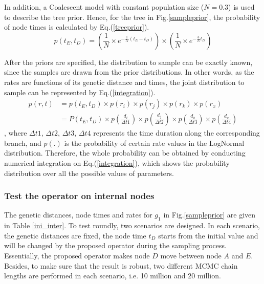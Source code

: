 \documentclass{bmcart}
\begin{document}
In addition, a Coalescent model with constant population size ($N=0.3$) is used to describe the tree prior. Hence, for the tree in Fig.\ref{sampleprior}, the probability of node times is calculated by Eq.(\ref{treeprior}).
\begin{equation}\label{treeprior}
p({t_E},{t_D}) = (\frac{1}{N} \times {e^{ - \frac{1}{N}({t_E} - {t_D})}}) \times (\frac{1}{N} \times {e^{ - \frac{3}{N}{t_D}}})
\end{equation}

After the priors are specified, the distribution to sample can be exactly known, since the samples are drawn from the prior distributions. In other words, as the rates are functions of its genetic distance and times, the joint distribution to sample can be represented by Eq.(\ref{integration}).
\begin{equation}\label{integration}
\begin{aligned}
p(r,t) &= p({t_E},{t_D}) \times p({r_i}) \times p({r_j}) \times p({r_k}) \times p({r_x}) \\&= P({t_E},{t_D}) \times p(\frac{{{d_i}}}{{\Delta t1}}) \times p(\frac{{{d_j}}}{{\Delta t2}}) \times p(\frac{{{d_k}}}{{\Delta t3}}) \times p(\frac{{{d_x}}}{{\Delta t4}})
\end{aligned}
\end{equation}
, where ${\Delta t1}$, ${\Delta t2}$, ${\Delta t3}$, ${\Delta t4}$ represents the time duration along the corresponding branch, and $p({.})$ is the probability of certain rate values in the LogNormal distribution. Therefore, the whole probability can be obtained by conducting numerical integration on Eq.(\ref{integration}), which shows the probability distribution over all the possible values of parameters.
\subsubsection*{Test the operator on internal nodes}
The genetic distances, node times and rates for $g_1$ in Fig.\ref{sampleprior} are given in Table \ref{ini_inter}. To test roundly, two scenarios are designed. In each scenario, the genetic distances are fixed, the node time $t_D$ starts from the initial value and will be changed by the proposed operator during the sampling process. Essentially, the proposed operator makes node $D$ move between node $A$ and $E$. Besides, to make sure that the result is robust, two different MCMC chain lengths are performed in each scenario, i.e. 10 million and 20 million.
\end{document}
